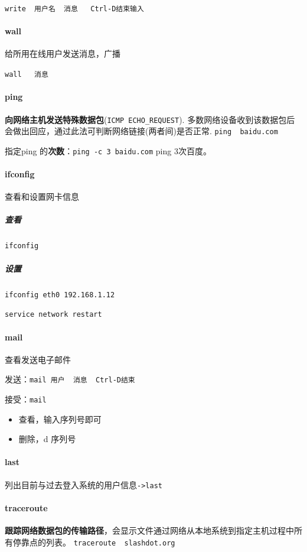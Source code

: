 \documentclass[UTF8,a4paper,12pt]{ctexbook}
\begin{document}
				\verb|write  用户名  消息   Ctrl-D结束输入|
			
			\paragraph{wall} 给所用在线用户发送消息，广播
			
				\verb|wall   消息|
				
			\paragraph{ping} \textbf{向网络主机发送特殊数据包}(\verb|ICMP ECHO_REQUEST|). 多数网络设备收到该数据包后会做出回应，通过此法可判断网络链接(两者间)是否正常. \verb|ping  baidu.com|
			
				指定ping 的\textbf{次数}：\verb|ping -c 3 baidu.com| ping 3次百度。
			
			\paragraph{ifconfig} 查看和设置网卡信息
			
				\subparagraph{查看} \verb|ifconfig|
				
				\subparagraph{设置} \verb|ifconfig eth0 192.168.1.12|
				
				\verb|service network restart|
				
			\paragraph{mail} 查看发送电子邮件
				
				发送：\verb|mail 用户  消息  Ctrl-D结束|
				
				接受：\verb|mail|
					\begin{itemize}[itemindent = 1em]
						\item 查看，输入序列号即可
						\item 删除，d 序列号
					\end{itemize}
			
			\paragraph{last} 列出目前与过去登入系统的用户信息\verb|->last|
				
			\paragraph{traceroute} \textbf{跟踪网络数据包的传输路径}，会显示文件通过网络从本地系统到指定主机过程中所有停靠点的列表。 \verb|traceroute  slashdot.org|
			
\end{document}
